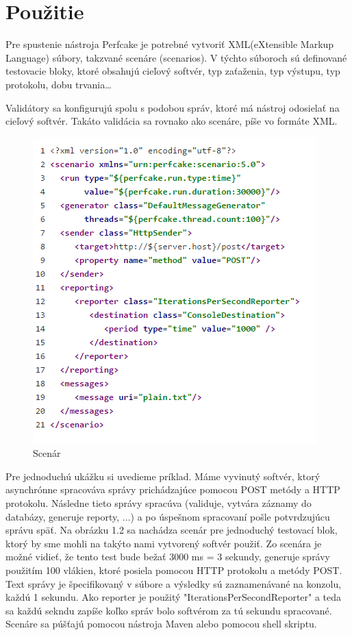 \section{Použitie}

Pre spustenie nástroja Perfcake je potrebné vytvoriť XML(eXtensible Markup Language) súbory, takzvané scenáre (scenarios). V týchto súboroch sú definované testovacie bloky, ktoré obsahujú cieľový softvér, typ zaťaženia, typ výstupu, typ protokolu, dobu trvania\dots

Validátory sa konfigurujú spolu s podobou správ, ktoré má nástroj odosielať na cieľový softvér. Takáto validácia sa rovnako ako scenáre, píše vo formáte XML.

\begin{figure}[ht]
\includegraphics[scale=1]{scenario.png}
\caption{Scenár}
\end{figure}

Pre jednoduchú ukážku si uvedieme príklad. Máme vyvinutý softvér, ktorý asynchrónne spracováva správy prichádzajúce pomocou POST metódy a HTTP protokolu. Následne tieto správy spracúva (validuje, vytvára záznamy do databázy, generuje reporty, ...) a po úspešnom spracovaní pošle potvrdzujúcu správu späť.
Na obrázku 1.2 sa nachádza scenár pre jednoduchý testovací blok, ktorý by sme mohli na takýto nami vytvorený softvér použiť. Zo scenára je možné vidieť, že tento test bude bežať 3000 ms = 3 sekundy, generuje správy použitím 100 vlákien, ktoré posiela pomocou HTTP protokolu a metódy POST. Text správy je špecifikovaný v súbore  a výsledky sú zaznamenávané na konzolu, každú 1 sekundu. Ako reporter je použitý "IterationsPerSecondReporter" a teda sa každú sekndu zapíše koľko správ bolo softvérom za tú sekundu spracované. Scenáre sa púšťajú pomocou nástroja Maven alebo pomocou shell skriptu.


